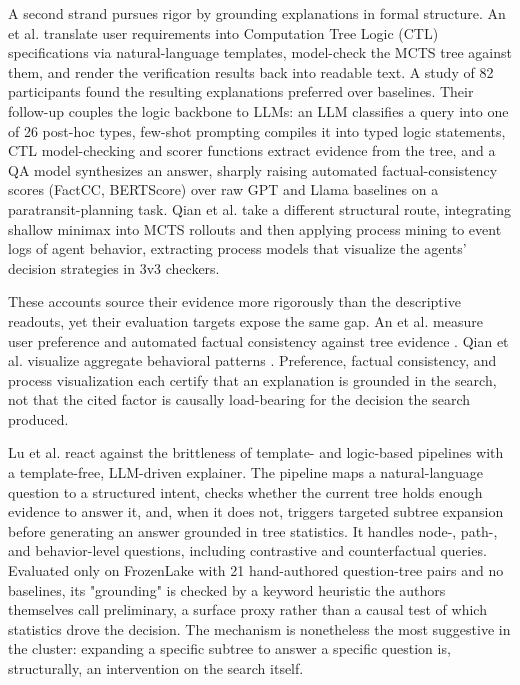 \documentclass[conference]{IEEEtran}
\begin{document}
A second strand pursues rigor by grounding explanations in formal structure. An et al. \cite{ref36} translate user requirements into Computation Tree Logic (CTL) specifications via natural-language templates, model-check the MCTS tree against them, and render the verification results back into readable text. A study of 82 participants found the resulting explanations preferred over baselines. Their follow-up \cite{ref37} couples the logic backbone to LLMs: an LLM classifies a query into one of 26 post-hoc types, few-shot prompting compiles it into typed logic statements, CTL model-checking and scorer functions extract evidence from the tree, and a QA model synthesizes an answer, sharply raising automated factual-consistency scores (FactCC, BERTScore) over raw GPT and Llama baselines on a paratransit-planning task. Qian et al. \cite{ref38} take a different structural route, integrating shallow minimax into MCTS rollouts and then applying process mining to event logs of agent behavior, extracting process models that visualize the agents' decision strategies in 3v3 checkers.

These accounts source their evidence more rigorously than the descriptive readouts, yet their evaluation targets expose the same gap. An et al. measure user preference \cite{ref36} and automated factual consistency against tree evidence \cite{ref37}. Qian et al. visualize aggregate behavioral patterns \cite{ref38}. Preference, factual consistency, and process visualization each certify that an explanation is grounded in the search, not that the cited factor is causally load-bearing for the decision the search produced.

Lu et al. \cite{ref35} react against the brittleness of template- and logic-based pipelines with a template-free, LLM-driven explainer. The pipeline maps a natural-language question to a structured intent, checks whether the current tree holds enough evidence to answer it, and, when it does not, triggers targeted subtree expansion before generating an answer grounded in tree statistics. It handles node-, path-, and behavior-level questions, including contrastive and counterfactual queries. Evaluated only on FrozenLake with 21 hand-authored question-tree pairs and no baselines, its "grounding" is checked by a keyword heuristic the authors themselves call preliminary, a surface proxy rather than a causal test of which statistics drove the decision. The mechanism is nonetheless the most suggestive in the cluster: expanding a specific subtree to answer a specific question is, structurally, an intervention on the search itself.
\end{document}

